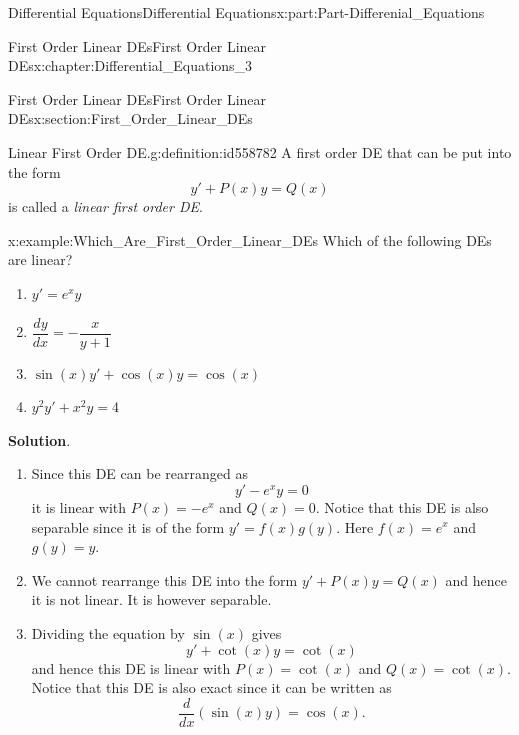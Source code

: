 \documentclass[oneside,10pt,]{book}
\newcommand{\blocktitlefont}{\relax}
\numberwithin{equation}{section}
\begin{document}
\begin{partptx}{Differential Equations}{}{Differential Equations}{}{}{x:part:Part-Differenial_Equations}
\begin{chapterptx}{First Order Linear DEs}{}{First Order Linear DEs}{}{}{x:chapter:Differential_Equations_3}
\typeout{************************************************}
%
\begin{sectionptx}{First Order Linear DEs}{}{First Order Linear DEs}{}{}{x:section:First_Order_Linear_DEs}
\begin{definition}{Linear First Order DE.}{g:definition:id558782}%
A first order DE that can be put into the form%
\begin{equation*}
y' + P(x) y = Q(x)
\end{equation*}
is called a \emph{linear first order DE}.%
\end{definition}
\begin{example}{}{x:example:Which_Are_First_Order_Linear_DEs}%
Which of the following DEs are linear?%
\par
%
\begin{enumerate}[label=\alph*]
\item{}\(\displaystyle y' = e^x y\)%
\item{}\(\displaystyle \dfrac{dy}{dx} = -\dfrac{x}{y+1}\)%
\item{}\(\displaystyle \sin(x) y' + \cos(x) y = \cos(x)\)%
\item{}\(\displaystyle y^2 y' + x^2 y =4\)%
\end{enumerate}
%
\par\smallskip%
\noindent\textbf{\blocktitlefont Solution}.\hypertarget{g:solution:id558797}{}\quad{}%
\begin{enumerate}[label=\alph*]
\item{}Since this DE can be rearranged as%
\begin{equation*}
y' - e^x y = 0
\end{equation*}
it is linear with \(P(x) = -e^x\) and \(Q(x) = 0\). Notice that this DE is also separable since it is of the form \(y' = f(x)g(y)\). Here \(f(x) = e^x\) and \(g(y) = y\).%
\item{}We cannot rearrange this DE into the form \(y' + P(x) y = Q(x)\) and hence it is not linear. It is however separable.%
\item{}Dividing the equation by \(\sin(x)\) gives%
\begin{equation*}
y' + \cot(x) y = \cot(x)
\end{equation*}
and hence this DE is linear with \(P(x) = \cot(x)\) and \(Q(x) = \cot(x)\). Notice that this DE is also exact since it can be written as%
\begin{equation*}
\dfrac{d}{dx} \left( \sin(x) y \right) = \cos(x)\text{.}
\end{equation*}

\end{enumerate}
\end{example}
\end{sectionptx}
\end{chapterptx}
\end{partptx}
\end{document}
